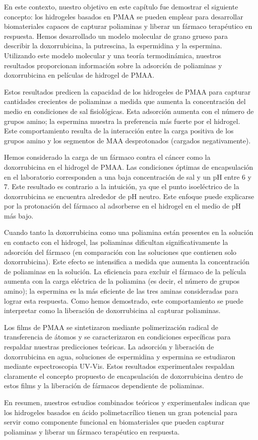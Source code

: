 En este contexto, nuestro objetivo en este cap\'itulo fue demostrar el siguiente concepto: los hidrogeles basados en PMAA se pueden emplear para desarrollar biomateriales capaces de capturar poliaminas y liberar un f\'armaco terap\'eutico en respuesta. Hemos desarrollado un modelo molecular de grano grueso para describir la doxorrubicina, la putrescina, la espermidina y la espermina. Utilizando este modelo molecular y una teor\'ia termodin\'amica, nuestros resultados proporcionan informaci\'on sobre la adsorci\'on de poliaminas y doxorrubicina en pel\'iculas de hidrogel de PMAA.

Estos resultados predicen la capacidad de los hidrogeles de PMAA para capturar cantidades crecientes de poliaminas a medida que aumenta la concentraci\'on del medio en condiciones de sal fisiol\'ogicas. Esta adsorci\'on aumenta con el n\'umero de grupos amino; la espermina muestra la preferencia m\'as fuerte por el hidrogel. Este comportamiento resulta de la interacci\'on entre la carga positiva de los grupos amino y los segmentos de MAA desprotonados (cargados negativamente).



Hemos considerado la carga de un f\'armaco contra el c\'ancer como la doxorrubicina en el hidrogel de PMAA. Las condiciones \'optimas de encapsulaci\'on en el laboratorio corresponden a una baja concentraci\'on de sal y un pH entre 6 y 7. Este resultado es contrario a la intuici\'on, ya que el punto isoel\'ectrico de la doxorrubicina se encuentra alrededor de pH neutro. Este enfoque puede explicarse por la protonaci\'on del f\'armaco al adsorberse en el hidrogel en el medio de pH m\'as bajo.

Cuando tanto la doxorrubicina como una poliamina est\'an presentes en la soluci\'on en contacto con el hidrogel, las poliaminas dificultan significativamente la adsorci\'on del f\'armaco (en comparaci\'on con las soluciones que contienen solo doxorrubicina). Este efecto se intensifica a medida que aumenta la concentraci\'on de poliaminas en la soluci\'on. La eficiencia para excluir el f\'armaco de la pel\'icula aumenta con la carga el\'ectrica  de la poliamina (es decir, el n\'umero de grupos amino); la espermina es la m\'as eficiente de las tres aminas consideradas para lograr esta respuesta. Como hemos demostrado, este comportamiento se puede interpretar como la liberaci\'on de doxorrubicina al capturar poliaminas.

Los films  de PMAA se sintetizaron mediante polimerizaci\'on radical de transferencia de \'atomos y se caracterizaron en condiciones espec\'ificas para respaldar nuestras predicciones te\'oricas. La adsorci\'on y liberaci\'on de doxorrubicina en agua, soluciones de espermidina y espermina se estudiaron mediante espectroscopia UV-Vis. Estos resultados experimentales respaldan claramente el concepto propuesto de encapsulaci\'on de doxorrubicina dentro de estos films y la liberaci\'on de f\'armacos dependiente de poliaminas. %

En resumen, nuestros estudios combinados te\'oricos y experimentales indican que los hidrogeles basados en \'acido polimetacr\'ilico tienen un gran potencial para servir como componente funcional en biomateriales que pueden capturar poliaminas y liberar un f\'armaco terap\'eutico en respuesta.